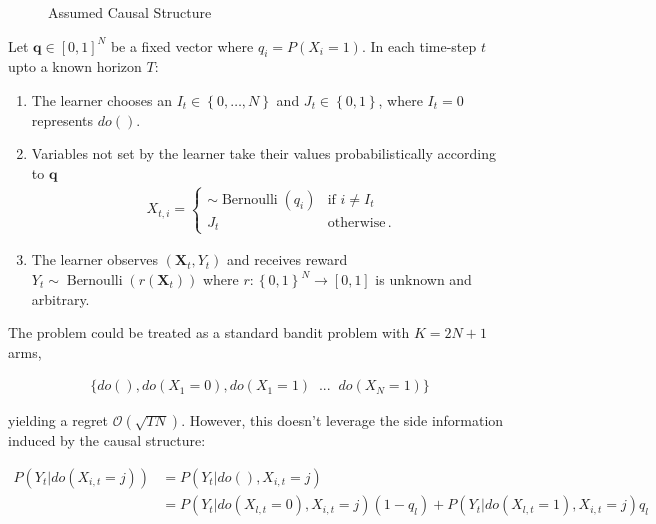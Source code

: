 \documentclass[11pt,a4paper]{article}
\newcommand{\set}[1]{\left\{#1\right\}}
\newcommand{\eqn}[1]{\begin{align}#1\end{align}}
\newcommand{\eq}[1]{\begin{align*}#1\end{align*}}
\newcommand{\Ber}{\operatorname{Bernoulli}}
\newcommand{\bigo}[1]{\mathcal{O}\left( #1 \right)}
\begin{document}
\begin{figure}[h]
\centering
\caption{Assumed Causal Structure}
\label{fig:causalStructure}
\end{figure}


Let $\boldsymbol{q} \in [0,1]^N$ be a fixed vector where $q_i = P(X_i = 1)$. In each time-step $t$ upto a known horizon $T$:
 
\begin{enumerate}
\item The learner chooses an $I_t \in \set{0,\ldots, N}$ and $J_t \in \set{0,1}$, where $I_t = 0$ represents $do()$.

\item Variables not set by the learner take their values probabilistically according to $\boldsymbol{q}$ 
\eq{
X_{t,i} = \begin{cases}
\sim \Ber(q_i) &\text{if } i \neq I_t \\
J_t & \text{otherwise}\,.
\end{cases}
}
\item The learner observes $(\boldsymbol{X}_{t},Y_{t})$ and receives reward $Y_t \sim \Ber(r(\boldsymbol{X}_{t}))$ where $r:\set{0,1}^N \to [0,1]$ is unknown and arbitrary. 
\end{enumerate}

The problem could be treated as a standard bandit problem with $K = 2N + 1$ arms, 

\eq {
\{do(), do(X_1=0), do(X_1 = 1)\;\; ... \;\;do(X_N = 1)\}
}

yielding a regret $\bigo{\sqrt{TN}}$. However, this doesn't leverage the side information induced by the causal structure: 

\eqn {
\label{eq:observe}
P(Y_t|do(X_{i,t} = j)) &= P(Y_t|do(),X_{i,t} = j) \\
\label{eq:estimation_transfer}
&= P(Y_t|do(X_{l,t}=0),X_{i,t}=j)(1-q_l)+P(Y_t|do(X_{l,t}=1),X_{i,t}=j)q_l 
}
\end{document}
